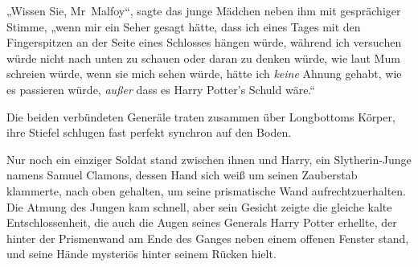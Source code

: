 „Wissen Sie, Mr~Malfoy“, sagte das junge Mädchen neben ihm mit gesprächiger Stimme, „wenn mir ein Seher gesagt hätte, dass ich eines Tages mit den Fingerspitzen an der Seite eines Schlosses hängen würde, während ich versuchen würde nicht nach unten zu schauen oder daran zu denken würde, wie laut Mum schreien würde, wenn sie mich sehen würde, hätte ich \emph{keine} Ahnung gehabt, wie es passieren würde, \emph{außer} dass es Harry Potter’s Schuld wäre.“


Die beiden verbündeten Generäle traten zusammen über Longbottoms Körper, ihre Stiefel schlugen fast perfekt synchron auf den Boden.

Nur noch ein einziger Soldat stand zwischen ihnen und Harry, ein Slytherin-Junge namens Samuel Clamons, dessen Hand sich weiß um seinen Zauberstab klammerte, nach oben gehalten, um seine prismatische Wand aufrechtzuerhalten. Die Atmung des Jungen kam schnell, aber sein Gesicht zeigte die gleiche kalte Entschlossenheit, die auch die Augen seines Generals Harry Potter erhellte, der hinter der Prismenwand am Ende des Ganges neben einem offenen Fenster stand, und seine Hände mysteriös hinter seinem Rücken hielt.

